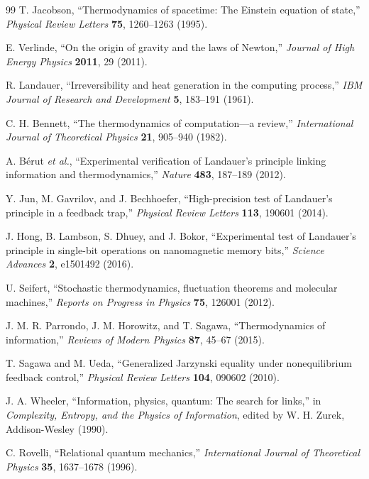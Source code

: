 \documentclass[10pt,a4paper,twocolumn,aps,prl]{revtex4-2}
\begin{document}
\begin{thebibliography}{99}
T. Jacobson, ``Thermodynamics of spacetime: The Einstein equation of state,'' \emph{Physical Review Letters} \textbf{75}, 1260--1263 (1995).

E. Verlinde, ``On the origin of gravity and the laws of Newton,'' \emph{Journal of High Energy Physics} \textbf{2011}, 29 (2011).

R. Landauer, ``Irreversibility and heat generation in the computing process,'' \emph{IBM Journal of Research and Development} \textbf{5}, 183--191 (1961).

C. H. Bennett, ``The thermodynamics of computation---a review,'' \emph{International Journal of Theoretical Physics} \textbf{21}, 905--940 (1982).

A. B\'{e}rut \emph{et al.}, ``Experimental verification of Landauer's principle linking information and thermodynamics,'' \emph{Nature} \textbf{483}, 187--189 (2012).

Y. Jun, M. Gavrilov, and J. Bechhoefer, ``High-precision test of Landauer's principle in a feedback trap,'' \emph{Physical Review Letters} \textbf{113}, 190601 (2014).

J. Hong, B. Lambson, S. Dhuey, and J. Bokor, ``Experimental test of Landauer's principle in single-bit operations on nanomagnetic memory bits,'' \emph{Science Advances} \textbf{2}, e1501492 (2016).

U. Seifert, ``Stochastic thermodynamics, fluctuation theorems and molecular machines,'' \emph{Reports on Progress in Physics} \textbf{75}, 126001 (2012).

J. M. R. Parrondo, J. M. Horowitz, and T. Sagawa, ``Thermodynamics of information,'' \emph{Reviews of Modern Physics} \textbf{87}, 45--67 (2015).

T. Sagawa and M. Ueda, ``Generalized Jarzynski equality under nonequilibrium feedback control,'' \emph{Physical Review Letters} \textbf{104}, 090602 (2010).

J. A. Wheeler, ``Information, physics, quantum: The search for links,'' in \emph{Complexity, Entropy, and the Physics of Information}, edited by W. H. Zurek, Addison-Wesley (1990).

C. Rovelli, ``Relational quantum mechanics,'' \emph{International Journal of Theoretical Physics} \textbf{35}, 1637--1678 (1996).


\end{thebibliography}
\end{document}
